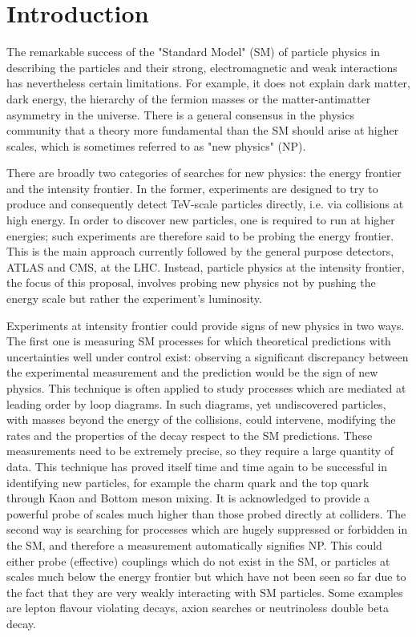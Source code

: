 
\section{Introduction}

The remarkable success of the "Standard Model" (SM) of particle physics in describing the particles and their strong, electromagnetic and weak interactions has nevertheless certain limitations. For example, it does not explain dark matter, dark energy, the hierarchy of the fermion masses or the matter-antimatter asymmetry in the universe. There is a general consensus in the physics community that a theory more fundamental than the SM should arise at higher scales, which is sometimes referred to as "new physics" (NP).

There are broadly two categories of searches for new physics: the energy frontier and the intensity frontier.  In the former, experiments are designed to try to produce and consequently detect TeV-scale particles directly, i.e. via collisions at high energy. In order to discover new particles, one is required to run at higher energies;  such experiments are therefore said to be probing the energy frontier. This is the main approach currently followed by the general purpose detectors, ATLAS and CMS, at the LHC. 
Instead, particle physics at the intensity frontier, the focus of this proposal,  involves probing new physics not by pushing the energy scale but rather the experiment's luminosity.

Experiments at intensity frontier could provide signs of new physics in two ways. The first one is  measuring SM processes for which theoretical predictions with uncertainties well under control  exist:  observing a significant discrepancy between the experimental measurement and the prediction  would be the sign of new physics. This technique is often applied to study processes which are mediated at leading order by loop diagrams. In such diagrams, yet undiscovered particles, with masses beyond the energy of the collisions, could  intervene, modifying the rates and the properties of the decay respect to the SM predictions. These measurements need to be extremely precise, so they require a large quantity of data.  This technique has proved itself time and time again to be successful in identifying new particles, for example the charm quark and the top quark through Kaon and Bottom meson mixing. It is acknowledged to provide a powerful probe of scales much higher than those probed directly at colliders. The second way is searching for processes which are hugely suppressed or forbidden in the SM, and therefore a measurement automatically signifies NP. This could either probe (effective) couplings which do not exist in the SM, or particles at scales much below the energy frontier but which have not  been seen so far due to the fact that they are very weakly interacting with SM particles. Some examples are lepton flavour violating decays, axion searches or neutrinoless double beta decay.

